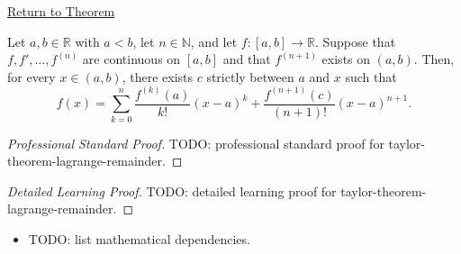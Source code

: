 \newpage
{}
\label{prf:taylor-theorem-lagrange-remainder}

\begin{remark*}[Return]
\hyperref[thm:taylor-theorem-lagrange-remainder]{Return to Theorem}
\end{remark*}

\begin{theorem*}
Let $a,b\in\mathbb{R}$ with $a<b$, let $n\in\mathbb{N}$, and let
$f:[a,b]\to\mathbb{R}$. Suppose that $f,f',\ldots,f^{(n)}$ are continuous
on $[a,b]$ and that $f^{(n+1)}$ exists on $(a,b)$. Then, for every
$x\in(a,b)$, there exists $c$ strictly between $a$ and $x$ such that
\[
  f(x)
  =
  \sum_{k=0}^{n}\frac{f^{(k)}(a)}{k!}(x-a)^k
  +
  \frac{f^{(n+1)}(c)}{(n+1)!}(x-a)^{n+1}.
\]

\smallskip
\noindent
\end{theorem*}

\begin{proof}[Professional Standard Proof]
\LRAProofBodyStart
TODO: professional standard proof for taylor-theorem-lagrange-remainder.
\end{proof}

\begin{proof}[Detailed Learning Proof]
\LRAProofBodyStart
TODO: detailed learning proof for taylor-theorem-lagrange-remainder.
\end{proof}

\begin{remark*}
\end{remark*}

\begin{dependencies}
\begin{itemize}
  \item TODO: list mathematical dependencies.
\end{itemize}
\end{dependencies}

\clearpage
